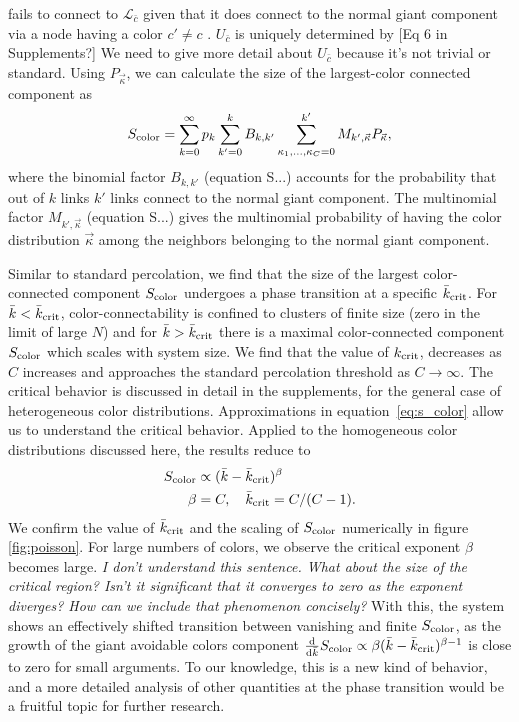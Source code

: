 \documentclass[aps, pre, twocolumn, a4paper, superscriptaddress, floatfix]{revtex4}
\newcommand{\kk}{\bar k }
\newcommand{\red}{\color{red}\footnotesize}
\newcommand{\scol}{S_{\rm color}}
\begin{document}
fails to connect to $\mathcal{L}_{\bar c}$ given that it does connect to the normal giant component 
via a node having a color $c'\neq c$ . 
$U_{\bar c}$ is uniquely determined by {\red[Eq 6 in Supplements?] We need to give more detail about $U_{\bar c}$ because it's not trivial or standard. }
Using $P_{\vec \kappa}$, we can calculate the size of the largest-color connected component as
\begin{equation}
S_{\rm color} = \sum_{k=0}^{\infty}p_k \sum_{k'=0}^{k} B_{k,k'} 
\sum_{\kappa_1,\dots, \kappa_C=0}^{k'} M_{k',\vec \kappa} 
P_{\vec \kappa},\label{eq:s_color}
\end{equation}
where the binomial factor $B_{k,k'}$ (equation S...) accounts for the probability that out of 
$k$ links $k'$ links connect to the normal giant component. The multinomial factor 
$M_{k',\vec \kappa}$ (equation S...) gives the multinomial probability of having the color 
distribution ${\vec \kappa}$ among the neighbors belonging to the normal giant component. 


Similar to standard percolation, we find that the size of the largest color-connected component $\scol$ undergoes a phase transition at a specific $\kk_{\rm crit}$.
For $\kk < \kk_{\rm crit}$, color-connectability is confined to clusters of finite size (zero in the limit of large $N$) and for $\kk > \kk_{\rm crit}$ there is a maximal color-connected component $\scol$ which scales with system size.
We find that the value of $k_{\rm crit}$, decreases as $C$ increases and approaches the standard percolation threshold as $C\rightarrow\infty$.
The critical behavior is discussed in detail in the supplements, for the general case of heterogeneous color distributions. 
Approximations in equation~\ref{eq:s_color} allow us to understand the critical behavior. 
Applied to the homogeneous color distributions discussed here, the results reduce to 
\begin{align}
S_{\rm color} &\propto ({\bar k}-{\bar k}_{\rm crit})^{\beta}\\
\beta&=C,\quad {\bar k}_{\rm crit} = C/(C-1).
\end{align}
We confirm the value of $\kk_{\rm crit}$ and the scaling of $\scol$  numerically in figure \ref{fig:poisson}.
For large numbers of colors, we observe the critical exponent $\beta$ becomes large. 
{\red\textit{ I don't understand this sentence.  What about the size of the critical region? Isn't it significant that it converges to zero as the exponent diverges? How can we include that phenomenon concisely?} With this, the system shows an effectively shifted transition between vanishing and finite $S_{\rm color}$, 
as the growth of the giant avoidable colors component 
$\frac{\rm d}{{\rm d} {\bar k}}S_{\rm color}\propto \beta ({\bar k}-{\bar k}_{\rm crit})^{\beta-1}$ 
is close to zero for small arguments. }
To our knowledge, this is a new kind of behavior, 
and a more detailed analysis of other quantities at the phase transition would be a fruitful topic for further research. 
\end{document}
